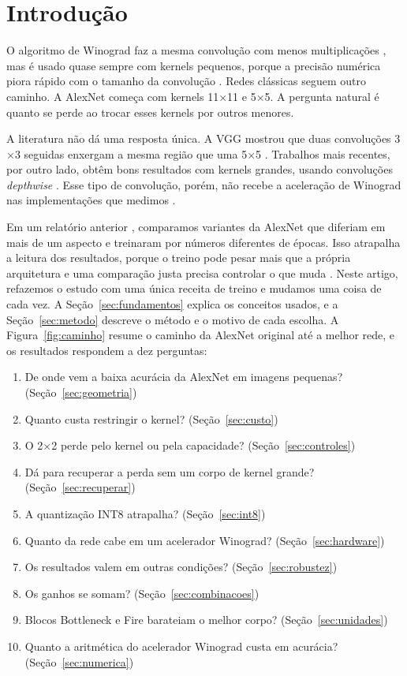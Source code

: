 \documentclass[conference]{IEEEtran}
\newcommand{\by}{\ensuremath{\times}}
\begin{document}
\section{Introdução}

O algoritmo de Winograd faz a mesma convolução com menos multiplicações \cite{lavin2016fast}, mas é usado quase sempre com kernels
pequenos, porque a precisão numérica piora rápido com o tamanho da convolução \cite{barabasz2020error}. Redes clássicas seguem outro
caminho. A AlexNet \cite{krizhevsky2012imagenet} começa com kernels 11\by11 e 5\by5. A pergunta natural é quanto se perde ao trocar esses
kernels por outros menores.

A literatura não dá uma resposta única. A VGG mostrou que duas convoluções 3\by3 seguidas enxergam a mesma região que uma 5\by5
\cite{simonyan2015very}. Trabalhos mais recentes, por outro lado, obtêm bons resultados com kernels grandes, usando convoluções
\textit{depthwise} \cite{liu2022convnext,ding2022scaling}. Esse tipo de convolução, porém, não recebe a aceleração de Winograd nas
implementações que medimos \cite{souza2026relatorio}.

Em um relatório anterior \cite{souza2026relatorio}, comparamos variantes da AlexNet que diferiam em mais de um aspecto e treinaram por
números diferentes de épocas. Isso atrapalha a leitura dos resultados, porque o treino pode pesar mais que a própria arquitetura
\cite{bello2021revisiting,wightman2021resnet} e uma comparação justa precisa controlar o que muda \cite{radosavovic2019network}. Neste
artigo, refazemos o estudo com uma única receita de treino e mudamos uma coisa de cada vez. A Seção~\ref{sec:fundamentos} explica os
conceitos usados, e a Seção~\ref{sec:metodo} descreve o método e o motivo de cada escolha. A Figura~\ref{fig:caminho} resume o caminho
da AlexNet original até a melhor rede, e os resultados respondem a dez perguntas:
\begin{enumerate}
\item De onde vem a baixa acurácia da AlexNet em imagens pequenas? (Seção~\ref{sec:geometria})
\item Quanto custa restringir o kernel? (Seção~\ref{sec:custo})
\item O 2\by2 perde pelo kernel ou pela capacidade? (Seção~\ref{sec:controles})
\item Dá para recuperar a perda sem um corpo de kernel grande? (Seção~\ref{sec:recuperar})
\item A quantização INT8 atrapalha? (Seção~\ref{sec:int8})
\item Quanto da rede cabe em um acelerador Winograd? (Seção~\ref{sec:hardware})
\item Os resultados valem em outras condições? (Seção~\ref{sec:robustez})
\item Os ganhos se somam? (Seção~\ref{sec:combinacoes})
\item Blocos Bottleneck e Fire barateiam o melhor corpo? (Seção~\ref{sec:unidades})
\item Quanto a aritmética do acelerador Winograd custa em acurácia? (Seção~\ref{sec:numerica})
\end{enumerate}
\end{document}

